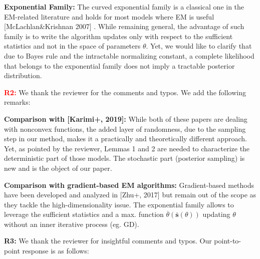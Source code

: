 \documentclass{article}
\begin{document}
\textbf{Exponential Family:} 
The curved exponential family is a classical one in the EM-related literature and holds for most models where  EM is useful [McLachlan\&Krishnan 2007] . 
While remaining general, the advantage of such family is to write the algorithm updates only with respect to the sufficient statistics and not in the space of parameters $\theta$. 
Yet, we would like to clarify that due to Bayes rule and the intractable normalizing constant, a complete likelihood that belongs to the exponential family does not imply a tractable posterior distribution.\vspace{-0.05in}


\textbf{\textcolor{red}{R2:}} We thank the reviewer for the comments and typos. We add the following remarks:\vspace{-0.05in}

\textbf{Comparison with [Karimi+, 2019]:} 
While both of these papers are dealing with nonconvex functions, the added layer of randomness, due to the sampling step in our method, makes it a practically and theoretically different approach.
Yet, as pointed by the reviewer, Lemmas 1 and 2 are needed to characterize the deterministic part of those models. 
The stochastic part (posterior sampling) is new and is the object of our paper.

\textbf{Comparison with gradient-based EM algorithms:} 
Gradient-based methods have been developed and analyzed in [Zhu+, 2017] but remain out of the scope as they tackle the high-dimensionality issue. 
The exponential family allows to leverage the sufficient statistics and a max. function $ \overline{\theta}( \overline{\textbf{s}}(\theta) )$ updating $\theta$ without an inner iterative process (eg. GD).\vspace{-0.05in}


\textbf{\textcolor{green!50!black}{R3:}} We thank the reviewer for insightful comments and typos. Our point-to-point response is as follows:\vspace{-0.05in}
\end{document}
